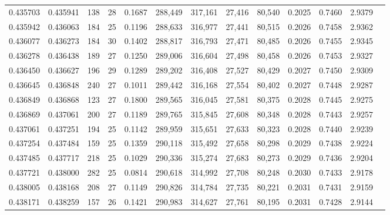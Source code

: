 \begin{tabular}{rrrrrrrrrrrrr}
0.435703 & 0.435941 &   138 &  28 &                                     0.1687 & 288,449 & 317,161 &  27,416 &  80,540 & 0.2025 & 0.7460 & 2.9379 \\
0.435942 & 0.436063 &   184 &  25 &                                     0.1196 & 288,633 & 316,977 &  27,441 &  80,515 & 0.2026 & 0.7458 & 2.9362 \\
0.436077 & 0.436273 &   184 &  30 &                                     0.1402 & 288,817 & 316,793 &  27,471 &  80,485 & 0.2026 & 0.7455 & 2.9345 \\
0.436278 & 0.436438 &   189 &  27 &                                     0.1250 & 289,006 & 316,604 &  27,498 &  80,458 & 0.2026 & 0.7453 & 2.9327 \\
0.436450 & 0.436627 &   196 &  29 &                                     0.1289 & 289,202 & 316,408 &  27,527 &  80,429 & 0.2027 & 0.7450 & 2.9309 \\
0.436645 & 0.436848 &   240 &  27 &                                     0.1011 & 289,442 & 316,168 &  27,554 &  80,402 & 0.2027 & 0.7448 & 2.9287 \\
0.436849 & 0.436868 &   123 &  27 &                                     0.1800 & 289,565 & 316,045 &  27,581 &  80,375 & 0.2028 & 0.7445 & 2.9275 \\
0.436869 & 0.437061 &   200 &  27 &                                     0.1189 & 289,765 & 315,845 &  27,608 &  80,348 & 0.2028 & 0.7443 & 2.9257 \\
0.437061 & 0.437251 &   194 &  25 &                                     0.1142 & 289,959 & 315,651 &  27,633 &  80,323 & 0.2028 & 0.7440 & 2.9239 \\
0.437254 & 0.437484 &   159 &  25 &                                     0.1359 & 290,118 & 315,492 &  27,658 &  80,298 & 0.2029 & 0.7438 & 2.9224 \\
0.437485 & 0.437717 &   218 &  25 &                                     0.1029 & 290,336 & 315,274 &  27,683 &  80,273 & 0.2029 & 0.7436 & 2.9204 \\
0.437721 & 0.438000 &   282 &  25 &                                     0.0814 & 290,618 & 314,992 &  27,708 &  80,248 & 0.2030 & 0.7433 & 2.9178 \\
0.438005 & 0.438168 &   208 &  27 &                                     0.1149 & 290,826 & 314,784 &  27,735 &  80,221 & 0.2031 & 0.7431 & 2.9159 \\
0.438171 & 0.438259 &   157 &  26 &                                     0.1421 & 290,983 & 314,627 &  27,761 &  80,195 & 0.2031 & 0.7428 & 2.9144 \\

\end{tabular}
